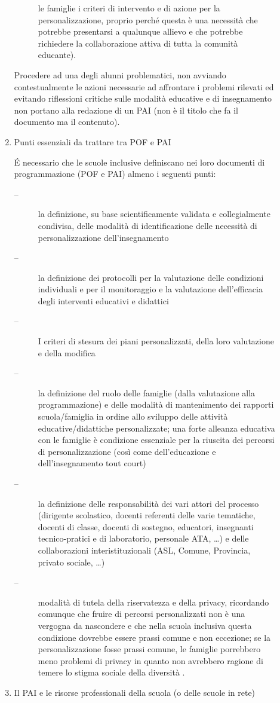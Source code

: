 \begin{description}
\begin{enumerate}
\begin{description}
			le famiglie i criteri di intervento e di azione per la personalizzazione, proprio perché questa è
			una necessità che potrebbe presentarsi a qualunque allievo e che potrebbe richiedere la
			collaborazione attiva di tutta la comunità educante).
		\end{description}
		Procedere ad una  degli alunni problematici, non avviando contestualmente le azioni
		necessarie ad affrontare i problemi rilevati ed evitando riflessioni critiche sulle modalità educative e di
		insegnamento non portano alla redazione di un PAI (non è il titolo che fa il documento ma il contenuto).
		\item Punti essenziali da trattare tra POF e PAI
		
		\'{E} necessario che le scuole inclusive definiscano nei loro documenti di programmazione (POF e PAI)
		almeno i seguenti punti:
		\begin{description}
			\item[--] la definizione, su base scientificamente validata e collegialmente condivisa, delle modalità di
			identificazione delle necessità di personalizzazione dell'insegnamento
			\item[--] la definizione dei protocolli per la valutazione delle condizioni individuali e per il monitoraggio
			e la valutazione dell'efficacia degli interventi educativi e didattici
			\item[--] I criteri di stesura dei piani personalizzati, della loro valutazione e della modifica
			\item[--] la definizione del ruolo delle famiglie (dalla valutazione alla programmazione) e delle modalità 
			di mantenimento dei rapporti scuola/famiglia in ordine allo sviluppo delle attività 
			educative/didattiche personalizzate; una forte alleanza educativa con le famiglie è condizione
			essenziale per la riuscita dei percorsi di personalizzazione (così come dell'educazione e
			dell'insegnamento tout court)
			\item[--] la definizione delle responsabilità dei vari attori del processo (dirigente scolastico, docenti
			referenti delle varie tematiche, docenti di classe, docenti di sostegno, educatori, insegnanti
			tecnico-pratici e di laboratorio, personale ATA, …) e delle collaborazioni interistituzionali (ASL,
			Comune, Provincia, privato sociale, \ldots)
			\item[--] modalità di tutela della riservatezza e della privacy, ricordando comunque che fruire di percorsi
			personalizzati non è una vergogna da nascondere e che nella scuola inclusiva questa
			condizione dovrebbe essere prassi comune e non eccezione; se la personalizzazione fosse
			prassi comune, le famiglie porrebbero meno problemi di privacy in quanto non avrebbero
			ragione di temere lo stigma sociale della diversità .
		\end{description}
			\item Il PAI e le risorse professionali della scuola (o delle scuole in rete)
			

\end{enumerate}
\end{description}
